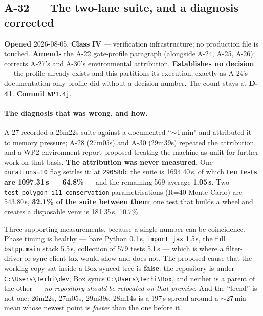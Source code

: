 \documentclass[
  10pt,
]{article}
\begin{document}
\hypertarget{a-32}{%
\subsection{A-32 --- The two-lane suite, and a diagnosis corrected}\label{a-32}}

\textbf{Opened} 2026-08-05. \textbf{Class} \textbf{IV} --- verification infrastructure; no production file is touched. \textbf{Amends} the A-22 gate-profile paragraph (alongside A-24, A-25, A-26); corrects A-27's and A-30's environmental attribution. \textbf{Establishes no decision} --- the profile already exists and this partitions its execution, exactly as A-24's documentation-only profile did without a decision number. The count stays at \textbf{D-41}. \textbf{Commit} \texttt{WP1.4j}.

\paragraph{The diagnosis that was wrong, and how.}
A-27 recorded a 26m22s suite against a documented ``$\sim$1\,min'' and attributed it to memory pressure; A-28 (27m05s) and A-30 (29m39s) repeated the attribution, and a WP2 environment report proposed treating the machine as unfit for further work on that basis. \textbf{The attribution was never measured.} One \texttt{-{}-durations=10} flag settles it: at \texttt{29058dc} the suite is 1694.40\,s, of which \textbf{ten tests are 1097.31\,s --- 64.8\%} --- and the remaining 569 average \textbf{1.05\,s}. Two \texttt{test\_polygon\_i11\_conservation} parametrisations (R=40 Monte Carlo) are 543.80\,s, \textbf{32.1\% of the suite between them}; one test that builds a wheel and creates a disposable venv is 181.35\,s, 10.7\%.

Three supporting measurements, because a single number can be coincidence. Phase timing is healthy --- bare Python 0.1\,s, \texttt{import jax} 1.5\,s, the full \texttt{bstpp.main} stack 5.5\,s, collection of 579 tests 5.1\,s --- which is where a filter-driver or sync-client tax would show and does not. The proposed cause that the working copy sat inside a Box-synced tree is \textbf{false}: the repository is under \texttt{C:\textbackslash Users\textbackslash Terhi\textbackslash dev}, Box syncs \texttt{C:\textbackslash Users\textbackslash Terhi\textbackslash Box}, and neither is a parent of the other --- \emph{no repository should be relocated on that premise}. And the ``trend'' is not one: 26m22s, 27m05s, 29m39s, 28m14s is a 197\,s spread around a $\sim$27\,min mean whose newest point is \emph{faster} than the one before it.
\end{document}
